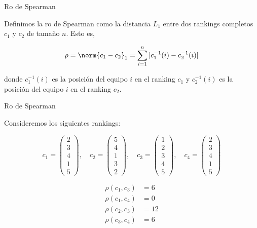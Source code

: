 \documentclass[10pt]{beamer}
\begin{document}
	\begin{frame}{Ro de Spearman}
		\begin{defi}
			Definimos la ro de Spearman como la distancia $L_1$ entre dos rankings completos $c_1$ y $c_2$ de tamaño $n$. Esto es, 
			
			\begin{equation}
			\rho = \norm{c_1 - c_2}_1 = \sum\limits_{i=1}^{n} |c_1^{-1}(i) - c_2^{-1}(i)|
			\end{equation}
			
			donde $c_1^{-1}(i)$ es la posición del equipo $i$ en el ranking $c_1$ y $c_2^{-1}(i)$ es la posición del equipo $i$ en el ranking $c_2$.
		\end{defi}
	
	\end{frame}
	
	\begin{frame}{Ro de Spearman}
		\begin{ejemplo}
			Consideremos los siguientes rankings:
			
			\begin{equation*}
			c_1 = \left( \begin{array}{c}
			2\\
			3\\
			4\\
			1\\
			5
			\end{array} \right), \quad
			c_2 = \left( \begin{array}{c}
			5\\
			4\\
			1\\
			3\\
			2
			\end{array} \right), \quad
			c_3 = \left( \begin{array}{c}
			1\\
			2\\
			3\\
			4\\
			5
			\end{array} \right), \quad
			c_4 = \left( \begin{array}{c}
			2\\
			3\\
			4\\
			1\\
			5
			\end{array} \right)
			\end{equation*}
			
			\begin{align*}
			\rho(c_1, c_3) & = 6\\
			\rho(c_1, c_4) & = 0\\
			\rho(c_2, c_3) & = 12\\
			\rho(c_3, c_4) & = 6
			\end{align*}  
		\end{ejemplo}
		
	\end{frame}
	
\end{document}
